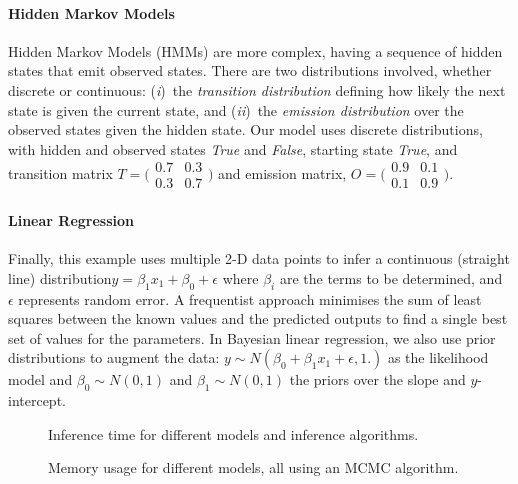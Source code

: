\documentclass[sigconf]{acmart}
\newcommand{\one}{({\em i})\/}
\newcommand{\two}{({\em ii})\/}
\newcommand{\pupil}{Pupil\xspace}
\begin{document}
\paragraph{Hidden Markov Models}
Hidden Markov Models (HMMs) are more complex, having a sequence of hidden states that emit observed states. There are two distributions involved, whether discrete or continuous: \one~the \emph{transition distribution} defining how likely the next state is given the current state, and \two~the \emph{emission distribution} over the observed states given the hidden state. Our model uses discrete distributions, with hidden and observed states \emph{True} and \emph{False}, starting state \emph{True}, and transition matrix
$T = \big(\begin{smallmatrix}
  0.7 & 0.3 \\
  0.3 & 0.7
\end{smallmatrix}\big)$
and emission matrix,
$O = \big(\begin{smallmatrix}
  0.9 & 0.1 \\
  0.1 & 0.9
\end{smallmatrix}\big)$.

\paragraph{Linear Regression}
Finally, this example uses multiple 2-D data points to infer a continuous (straight line) distribution$ y=\beta_1 x_1 + \beta_0 + \epsilon$ where  $\beta_i$ are the terms to be determined, and $\epsilon$ represents random error. A frequentist approach minimises the sum of least squares between the known values and the predicted outputs to find a single best set of values for the parameters. In Bayesian linear regression, we also use prior distributions to augment the data:   $y \sim N(\beta_0 + \beta_1 x_1 + \epsilon, 1.)$ as the likelihood model and $\beta_0 \sim N(0,1)$ and $\beta_1 \sim N(0,1)$ the priors over the slope and $y$-intercept.

\begin{figure*}
  \centering
  \begin{subfigure}[t]{\textwidth}
    \centering
    
    \caption{\label{fig:time-perf}
      Inference time for different models and inference algorithms.}
  \end{subfigure}
  \begin{subfigure}[t]{\textwidth}
    \centering
    
    \caption{\label{fig:mem-perf}
      Memory usage for different models, all using an MCMC algorithm.}
  \end{subfigure}
  \caption{\pupil performance, taking 10,000 samples from the posterior, averaged over 20 runs. Results shown for Metropolis-Hastings (\emph{mh}), Bootstrap Particle Filter (\emph{smc}), and Rejection Sampling (\emph{rej}). Error bars show the 95\% confidence interval. }
\end{figure*}
\end{document}
